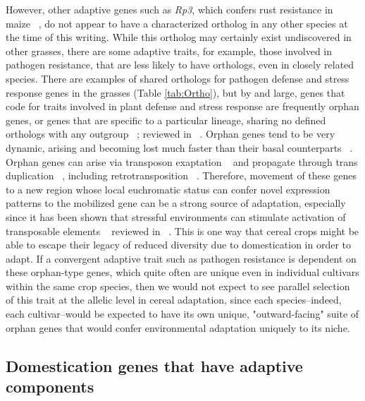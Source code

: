 \documentclass[12pt]{article}
\begin{document}
However, other adaptive genes such as \textit{Rp3}, which confers rust resistance in maize ~\citep{pmid12242248}, do not appear to have a characterized ortholog in any other species at the time of this writing.
While this ortholog may certainly exist undiscovered in other grasses, there are some adaptive traits, for example, those involved in pathogen resistance, that are less likely to have orthologs, even in closely related species.
There are examples of shared orthologs for pathogen defense and stress response genes in the grasses (Table \ref{tab:Ortho}), but by and large, genes that code for traits involved in plant defense and stress response are frequently orphan genes, or genes that are specific to a particular lineage, sharing no defined orthologs with any outgroup ~\citep{Woodhouse2011}; reviewed in ~\citep{Arendsee2014}.
Orphan genes tend to be very dynamic, arising and becoming lost much faster than their basal counterparts ~\citep{Freeling2008}.
Orphan genes can arise via transposon exaptation ~\citep{Donoghue2011} and propagate through trans duplication ~\citep{Freeling2008, Arendsee2014}, including retrotransposition ~\citep{Wang2006}. 
Therefore, movement of these genes to a new region whose local euchromatic status can confer novel expression patterns to the mobilized gene can be a strong source of adaptation, especially since it has been shown that stressful environments can stimulate activation of transposable elements ~\citep{Beguiristain2001, Makarevitch2015}  reviewed in ~\citep{Negi2016}. 
This is one way that cereal crops might be able to escape their legacy of reduced diversity due to domestication in order to adapt. 
If a convergent adaptive trait such as pathogen resistance is dependent on these orphan-type genes, which quite often are unique even in individual cultivars within the same crop species, then we would not expect to see parallel selection of this trait at the allelic level in cereal adaptation, since each species--indeed, each cultivar--would be expected to have its own unique, "outward-facing" suite of orphan genes that would confer environmental adaptation uniquely to its niche.

\subsection*{Domestication genes that have adaptive components}
\end{document}

